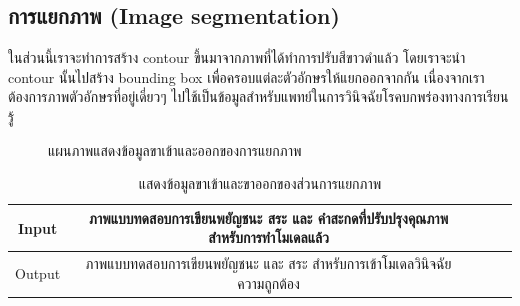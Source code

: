 \documentclass[12pt,oneside,openright,a4paper]{cpe-thai-project}
\begin{document}
  \subsection{การแยกภาพ (Image segmentation)}
  ในส่วนนี้เราจะทำการสร้าง contour ขึ้นมาจากภาพที่ได้ทำการปรับสีขาวดำแล้ว โดยเราจะนำ contour นั้นไปสร้าง bounding box 
  เพื่อครอบแต่ละตัวอักษรให้แยกออกจากกัน เนื่องจากเราต้องการภาพตัวอักษรที่อยู่เดี่ยวๆ ไปใช้เป็นข้อมูลสำหรับแพทย์ในการวินิจฉัยโรคบกพร่องทางการเรียนรู้ 
  \begin{figure}[!ht]\centering
    \setlength{\fboxrule}{0.2mm} %
    \setlength{\fboxsep}{1cm}
    \caption{แผนภาพแสดงข้อมูลขาเข้าและออกของการแยกภาพ}\label{fig:system}
   \end{figure}
  \begin{table}[!h]\centering
    \caption{แสดงข้อมูลขาเข้าและขาออกของส่วนการแยกภาพ}\label{tbl:application1}
    \begin{tabular}{c|c|l|rr} \hline
    Input & ภาพแบบทดสอบการเขียนพยัญชนะ สระ และ คำสะกดที่ปรับปรุงคุณภาพสำหรับการทำโมเดลแล้ว  \\ \hline
    Output & ภาพแบบทดสอบการเขียนพยัญชนะ และ สระ สำหรับการเข้าโมเดลวินิจฉัยความถูกต้อง \\ \hline
    \end{tabular}
    \end{table}

  \newpage
\end{document}
